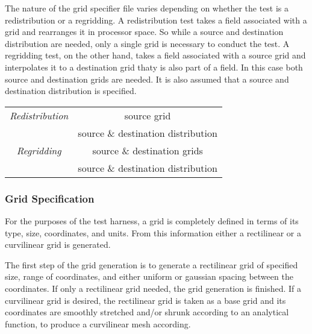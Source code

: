 The nature of the grid specifier file varies depending on whether the test is a redistribution or a regridding. A redistribution test takes a field associated with a grid and rearranges it in processor space. So while a source and destination distribution are needed, only a single grid is necessary to conduct the test. A regridding test, on the other hand, takes a field associated with a source grid and interpolates it to a destination grid thaty is also part of a field. In this case both source and destination grids are needed. It is also assumed that a source and destination distribution is specified.
\begin{center}
\begin{tabular}{| c | c |} \hline 
{\em Redistribution} &  source grid  \\
 & source \& destination distribution \\
\hline \hline
 {\em Regridding}  & source \& destination grids  \\
 &  source \& destination distribution \\
\hline
\end{tabular}
\end{center}


\subsubsection{Grid Specification}
\label{sec:harness_gridspecifier}
For the purposes of the test harness, a grid is completely defined in terms of its type, size, coordinates, and units. From this information either a rectilinear or a curvilinear grid is generated. 

The first step of the grid generation is to generate a rectilinear grid of specified size, range of coordinates, and either uniform or gaussian spacing between the coordinates. If only a rectilinear grid needed, the grid generation is finished. If a curvilinear grid is desired, the rectilinear grid is taken as a base grid and its coordinates are smoothly stretched and/or shrunk according to an analytical function, to produce a curvilinear mesh according.


